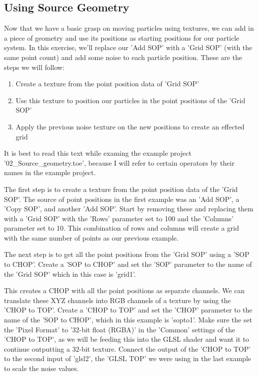 \subsection{Using Source Geometry}
\begin{fullwidth}
Now that we have a basic grasp on moving particles using textures, we can add in a piece of geometry and use its positions as starting positions for our particle system. In this exercise, we'll replace our 'Add SOP' with a 'Grid SOP' (with the same point count) and add some noise to each particle position. These are the steps we will follow:

\begin{enumerate}
\item Create a texture from the point position data of 'Grid SOP'
\item Use this texture to position our particles in the point positions of the 'Grid SOP'
\item Apply the previous noise texture on the new positions to create an effected grid
\end{enumerate}

It is best to read this text while examing the example project '02\_Source\_geometry.toe', because I will refer to certain operators by their names in the example project.

The first step is to create a texture from the point position data of the 'Grid SOP'. The source of point positions in the first example was an 'Add SOP', a 'Copy SOP', and another 'Add SOP'. Start by removing these and replacing them with a 'Grid SOP' with the 'Rows' parameter set to 100 and the 'Columns' parameter set to 10. This combination of rows and columns will create a grid with the same number of points as our previous example.

The next step is to get all the point positions from the 'Grid SOP' using a 'SOP to CHOP'. Create a 'SOP to CHOP' and set the 'SOP' parameter to the name of the 'Grid SOP' which in this case is 'grid1'.

This creates a CHOP with all the point positions as separate channels. We can translate these XYZ channels into RGB channels of a texture by using the 'CHOP to TOP'. Create a 'CHOP to TOP' and set the 'CHOP' parameter to the name of the 'SOP to CHOP', which in this example is 'sopto1'. Make sure the set the 'Pixel Format' to '32-bit float (RGBA)' in the 'Common' settings of the 'CHOP to TOP', as we will be feeding this into the GLSL shader and want it to continue outputting a 32-bit texture. Connect the output of the 'CHOP to TOP' to the second input of 'glsl2', the 'GLSL TOP' we were using in the last example to scale the noise values.


\end{fullwidth}
